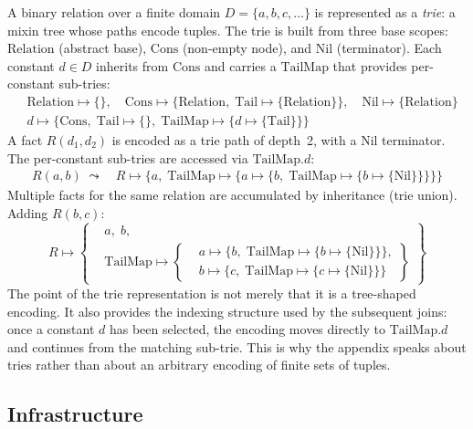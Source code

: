 A binary relation over a finite domain $D = \{a, b, c, \ldots\}$
is represented as a \emph{trie}: a mixin tree whose paths
encode tuples.
The trie is built from three base scopes:
$\mathrm{Relation}$ (abstract base),
$\mathrm{Cons}$ (non-empty node), and $\mathrm{Nil}$ (terminator).
Each constant $d \in D$ inherits from $\mathrm{Cons}$ and carries
a $\mathrm{TailMap}$ that provides per-constant sub-tries:
\begin{align*}
  &\mathrm{Relation} \mapsto \{\},\quad
  \mathrm{Cons} \mapsto \{\mathrm{Relation},\;
  \mathrm{Tail} \mapsto \{\mathrm{Relation}\}\},\quad
  \mathrm{Nil} \mapsto \{\mathrm{Relation}\}\\[2pt]
  &d \mapsto \{\mathrm{Cons},\;
    \mathrm{Tail} \mapsto \{\},\;
  \mathrm{TailMap} \mapsto \{d \mapsto \{\mathrm{Tail}\}\}\}
\end{align*}
A fact $R(d_1, d_2)$ is encoded as a trie path of depth~2,
with a $\mathrm{Nil}$ terminator.
The per-constant sub-tries are accessed via
$\mathrm{TailMap}.d$:
\begin{align*}
  R(a, b) \;\leadsto\quad
  R \mapsto \{a,\; \mathrm{TailMap} \mapsto \{a \mapsto
  \{b,\; \mathrm{TailMap} \mapsto \{b \mapsto \{\mathrm{Nil}\}\}\}\}\}
\end{align*}
Multiple facts for the same relation are accumulated by
inheritance (trie union).
Adding $R(b, c)$:
\[
  R \mapsto \left\{
    \begin{aligned}
      &a,\; b,\\
      &\mathrm{TailMap} \mapsto \left\{
        \begin{aligned}
          &a \mapsto \{b,\; \mathrm{TailMap} \mapsto \{b \mapsto \{\mathrm{Nil}\}\}\},\\
          &b \mapsto \{c,\; \mathrm{TailMap} \mapsto \{c \mapsto \{\mathrm{Nil}\}\}\}
      \end{aligned}\right\}
  \end{aligned}\right\}
\]
The point of the trie representation is not merely that it is a
tree-shaped encoding.
It also provides the indexing structure used by the subsequent
joins: once a constant $d$ has been selected, the encoding moves
directly to $\mathrm{TailMap}.d$ and continues from the matching
sub-trie.
This is why the appendix speaks about tries rather than about an
arbitrary encoding of finite sets of tuples.

\subsection{Infrastructure}

